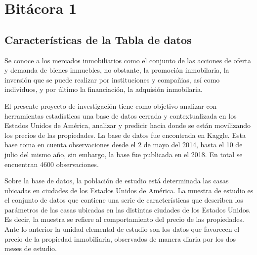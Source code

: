 \documentclass[
  oneside]{memoir}
\begin{document}
\begin{titlingpage}
\begin{center}


 
  \end{center}

\end{titlingpage}


\mainmatter
\fancyhead[LE,RO]{\slshape \rightmark}
\fancyhead[LO,RE]{\slshape \leftmark}
\rhead{\thepage}
\fancyfoot[C]{\thepage}

\tableofcontents*

\newpage
\chapter{Bitácora 1}

\section{Características de la Tabla de datos}

Se conoce a los mercados inmobiliarios como el conjunto de las acciones
de oferta y demanda de bienes inmuebles, no obstante, la promoción
inmobilaria, la inversión que se puede realizar por instituciones y
compañias, así como individuos, y por último la financiación, la
adquisión inmobilaria.

El presente proyecto de investigación tiene como objetivo analizar con
herramientas estadísticas una base de datos cerrada y contextualizada en
los Estados Unidos de América, analizar y predicir hacia donde se están
movilizando los precios de las propiedades. La base de datos fue
encontrada en Kaggle. Esta base toma en cuenta observaciones desde el 2
de mayo del 2014, hasta el 10 de julio del mismo año, sin embargo, la
base fue publicada en el 2018. En total se encuentran 4600
observaciones.

Sobre la base de datos, la población de estudio está determinada las
casas ubicadas en ciudades de los Estados Unidos de América. La muestra
de estudio es el conjunto de datos que contiene una serie de
características que describen los parámetros de las casas ubicadas en
las distintas ciudades de los Estados Unidos. Es decir, la muestra se
refiere al comportamiento del precio de las propiedades. Ante lo
anterior la unidad elemental de estudio son los datos que favorecen el
precio de la propiedad inmobiliaria, observados de manera diaria por los
dos meses de estudio.
\end{document}
